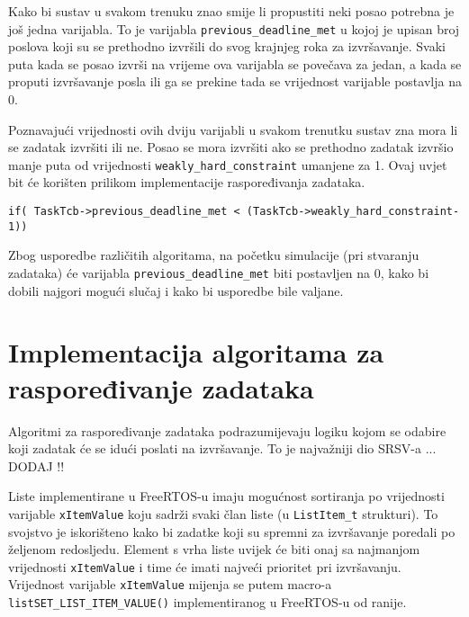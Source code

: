\documentclass[../zavrsni.tex]{subfiles}
\begin{document}
Kako bi sustav u svakom trenuku znao smije li propustiti neki posao potrebna je još jedna varijabla. To je varijabla 
\texttt{previous\_deadline\_met} u kojoj je upisan broj poslova koji su se prethodno izvršili do svog krajnjeg roka za izvršavanje.
Svaki puta kada se posao izvrši na vrijeme ova varijabla se povečava za jedan, a kada se proputi izvršavanje posla ili ga se prekine tada 
se vrijednost varijable postavlja na 0.

Poznavajući vrijednosti ovih dviju varijabli u svakom trenutku sustav zna mora li se zadatak izvršiti ili ne. Posao se mora izvršiti
ako se prethodno zadatak izvršio manje puta od vrijednosti \texttt{weakly\_hard\_constraint} umanjene za 1. Ovaj uvjet bit će 
korišten prilikom implementacije raspoređivanja zadataka.

\begin{lstlisting}[style=CStyle,caption={Uvjet za slučaj kada se zadatak mora izvršiti},captionpos=b]
if( TaskTcb->previous_deadline_met < (TaskTcb->weakly_hard_constraint-1))
\end{lstlisting}

Zbog usporedbe različitih algoritama, na početku simulacije (pri stvaranju zadataka) će varijabla \texttt{previous\_deadline\_met} 
biti postavljen na 0, kako bi dobili najgori mogući slučaj i kako bi usporedbe bile valjane.

\section{Implementacija algoritama za raspoređivanje zadataka}

Algoritmi za raspoređivanje zadataka podrazumijevaju logiku kojom se odabire koji zadatak će se idući poslati na izvršavanje.
To je najvažniji dio SRSV-a ... DODAJ !!

Liste implementirane u FreeRTOS-u imaju mogućnost sortiranja po vrijednosti varijable \texttt{xItemValue} koju sadrži svaki član liste 
(u \texttt{ListItem\_t} strukturi). To svojstvo je iskorišteno kako bi zadatke koji su spremni za izvršavanje poredali po željenom 
redosljedu. Element s vrha liste uvijek će biti onaj sa najmanjom vrijednosti \texttt{xItemValue} i time će imati najveći prioritet 
pri izvršavanju. Vrijednost varijable \texttt{xItemValue} mijenja se putem macro-a  \texttt{listSET\_LIST\_ITEM\_VALUE()} 
implementiranog u FreeRTOS-u od ranije.
\end{document}
